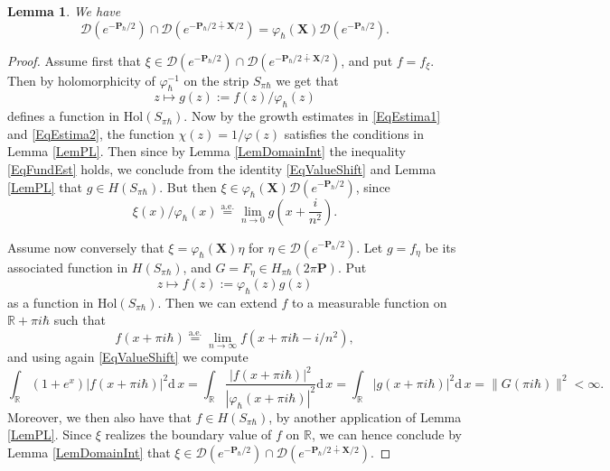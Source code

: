 \documentclass[11pt, reqno]{amsart}
\newtheorem{lemma}[theorem]{Lemma}
\theoremstyle{definition}
\numberwithin{equation}{section}
\def\msD{\mathscr D}
\def\R{\mathbb R}
\newcommand{\Pb}{\mathbf{P}}
\newcommand{\Xb}{\mathbf{X}}
\newcommand{\rd}{\mathrm{d}\!\,}
\newcommand{\Hol}{\mathrm{Hol}}
\begin{document}
\begin{lemma}\label{LemEqIdDomains}
We have 
\begin{equation}\label{EqIdDomains}
\msD(e^{-\Pb_{\hbar}/2}) \cap \msD(e^{-\Pb_{\hbar}/2\dotplus \Xb/2}) =   \varphi_{\hbar}(\Xb)\msD(e^{-\Pb_{\hbar}/2}).
\end{equation}
\end{lemma}
\begin{proof}
Assume first that $\xi \in \msD(e^{-\Pb_{\hbar}/2}) \cap \msD(e^{-\Pb_{\hbar}/2\dotplus \Xb/2})$, and put $f = f_{\xi}$. Then by holomorphicity of $\varphi_{\hbar}^{-1}$ on the strip $S_{\pi \hbar}$ we get that 
\[
z\mapsto g(z):= f(z)/\varphi_{\hbar}(z)
\]
defines a function in $\Hol(S_{\pi\hbar})$. Now by the growth estimates in \eqref{EqEstima1} and \eqref{EqEstima2}, the function
$\chi(z) = 1/\varphi(z)$ satisfies the conditions in Lemma \ref{LemPL}. Then since by Lemma \ref{LemDomainInt} the inequality \eqref{EqFundEst} holds, we conclude from the identity \eqref{EqValueShift} and Lemma \ref{LemPL} that $g \in H(S_{\pi\hbar})$. But then $\xi \in \varphi_{\hbar}(\Xb)\msD(e^{-\Pb_{\hbar}/2})$, since
\[
\xi(x)/\varphi_{\hbar}(x) \overset{\textrm{a.e.}}{=} \lim_{n\rightarrow 0} g(x+ \frac{i}{n^2}).
\]

Assume now conversely that $\xi = \varphi_{\hbar}(\Xb)\eta$ for $\eta\in \msD(e^{-\Pb_{\hbar}/2})$. Let $g = f_{\eta}$ be its associated function in $H(S_{\pi\hbar})$, and $G = F_{\eta}\in H_{\pi\hbar}(2\pi \Pb)$. Put 
\[
z\mapsto f(z):= \varphi_{\hbar}(z)g(z)
\]
as a function in $\Hol(S_{\pi\hbar})$. Then we can extend $f$ to a measurable function on $\R+\pi i \hbar$ such that 
\[
f(x+\pi i \hbar) \overset{\textrm{a.e.}}{=} \lim_{n\rightarrow \infty} f(x+ \pi i \hbar - i/n^2), 
\]
and using again \eqref{EqValueShift} we compute
\[
\int_{\R} (1+e^x)|f(x+\pi i \hbar)|^2\rd x =  \int_{\R} \frac{|f(x+\pi i \hbar)|^2}{|\varphi_{\hbar}(x+\pi i \hbar)|^2}\rd x =  \int_{\R}|g(x+\pi i \hbar)|^2\rd x =  \|G(\pi i \hbar)\|^2<\infty.
\]
Moreover, we then also have that $f\in H(S_{\pi\hbar})$, by another application of Lemma \ref{LemPL}. Since $\xi$ realizes the boundary value of $f$ on $\R$, we can hence conclude by Lemma \ref{LemDomainInt} that $\xi \in \msD(e^{-\Pb_{\hbar}/2}) \cap \msD(e^{-\Pb_{\hbar}/2\dotplus \Xb/2})$. 
\end{proof}
\end{document}
